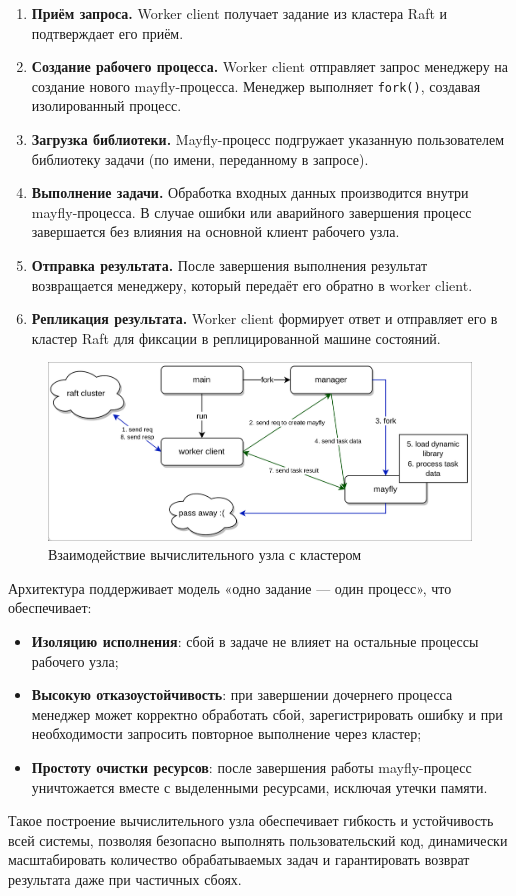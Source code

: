 \begin{enumerate}
    \item \textbf{Приём запроса.} Worker client получает задание
    из кластера Raft и подтверждает его приём.
    \item \textbf{Создание рабочего процесса.} Worker client
    отправляет запрос менеджеру на создание нового mayfly-процесса.
    Менеджер выполняет \texttt{fork()}, создавая изолированный процесс.
    \item \textbf{Загрузка библиотеки.} Mayfly-процесс подгружает
    указанную пользователем библиотеку задачи (по имени, переданному
    в запросе).
    \item \textbf{Выполнение задачи.} Обработка входных данных
    производится внутри mayfly-процесса.
    В случае ошибки или аварийного завершения процесс завершается
    без влияния на основной клиент рабочего узла.
    \item \textbf{Отправка результата.} После завершения выполнения
    результат возвращается менеджеру, который передаёт его обратно
    в worker client.
    \item \textbf{Репликация результата.} Worker client формирует
    ответ и отправляет его в кластер Raft для фиксации в
    реплицированной машине состояний.
\end{enumerate}

\begin{figure}
  \centering
  \includegraphics[scale=0.25]{inc/worker-arch.png}
  \caption{Взаимодействие вычислительного узла с кластером}
  \label{fig:worker-arch}
\end{figure}

Архитектура поддерживает модель «одно задание — один процесс», что
обеспечивает:

\begin{itemize}
    \item \textbf{Изоляцию исполнения}: сбой в задаче не влияет
    на остальные процессы рабочего узла;
    \item \textbf{Высокую отказоустойчивость}: при завершении
    дочернего процесса менеджер может корректно обработать сбой,
    зарегистрировать ошибку и при необходимости запросить
    повторное выполнение через кластер;
    \item \textbf{Простоту очистки ресурсов}: после завершения работы
    mayfly-процесс уничтожается вместе с выделенными ресурсами,
    исключая утечки памяти.
\end{itemize}

Такое построение вычислительного узла обеспечивает гибкость и устойчивость всей
системы, позволяя безопасно выполнять пользовательский код, динамически
масштабировать количество обрабатываемых задач и гарантировать возврат
результата даже при частичных сбоях.
